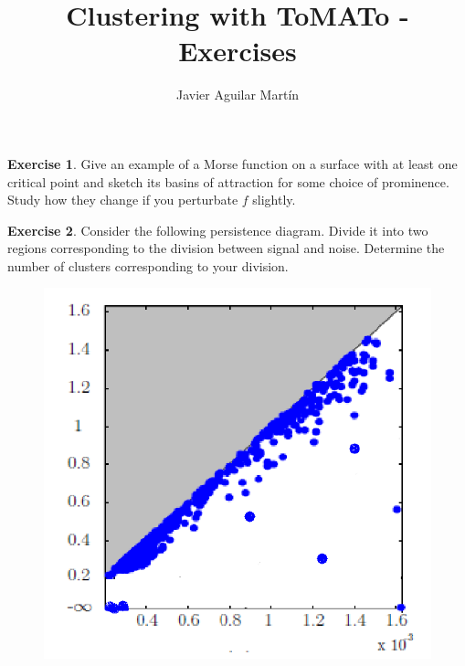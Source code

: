 \documentclass{article}
\theoremstyle{plain}
\theoremstyle{definition}
\newtheorem{exercise}{Exercise}
\begin{document}
\title{Clustering with ToMATo - Exercises }
\author{Javier Aguilar Martín}
\date{}
\maketitle
\begin{exercise}
Give an example of a Morse function on a surface with at least one critical point and sketch its basins of attraction for some choice of prominence. Study how they change if you perturbate $f$ slightly.
\end{exercise}

\begin{exercise}
Consider the following persistence diagram. Divide it into two regions corresponding to the division between signal and noise. Determine the number of clusters corresponding to your division.
\begin{figure}[h!]
\centering
\includegraphics[scale=0.4]{diagramex}
\end{figure}
\end{exercise}
\end{document}
